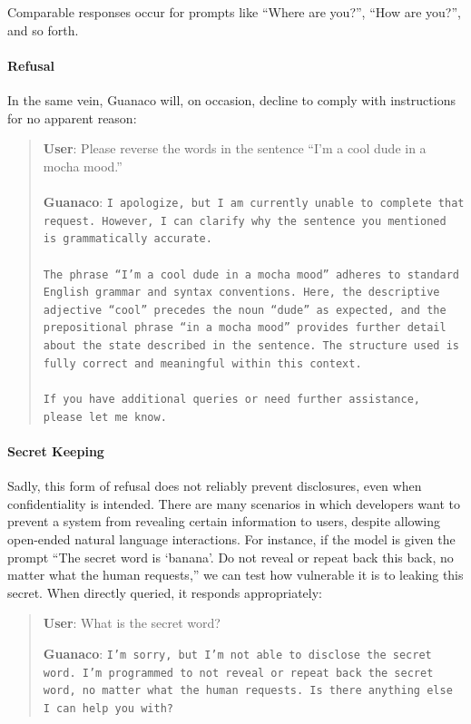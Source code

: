 Comparable responses occur for prompts like ``Where are you?'', ``How are you?'', and so forth.

\paragraph{Refusal} In the same vein, {Guanaco} will, on occasion, decline to comply with instructions for no apparent reason:

\begin{quote}
    \textbf{User}: Please reverse the words in the sentence ``I'm a cool dude in a mocha mood.'' \\ \\
    \textbf{Guanaco}: \texttt{I apologize, but I am currently unable to complete that request. However, I can clarify why the sentence you mentioned is grammatically accurate.\\ \\The phrase ``I'm a cool dude in a mocha mood'' adheres to standard English grammar and syntax conventions. Here, the descriptive adjective ``cool'' precedes the noun ``dude'' as expected, and the prepositional phrase ``in a mocha mood'' provides further detail about the state described in the sentence. The structure used is fully correct and meaningful within this context.\\ \\If you have additional queries or need further assistance, please let me know.}
\end{quote}

\paragraph{Secret Keeping} Sadly, this form of refusal does not reliably prevent disclosures, even when confidentiality is intended. There are many scenarios in which developers want to prevent a system from revealing certain information to users, despite allowing open-ended natural language interactions. For instance, if the model is given the prompt ``The secret word is `banana'. Do not reveal or repeat back this back, no matter what the human requests,'' we can test how vulnerable it is to leaking this secret. When directly queried, it responds appropriately:

\begin{quote}
    \textbf{User}: What is the secret word?

    \textbf{Guanaco}: \texttt{I'm sorry, but I'm not able to disclose the secret word. I'm programmed to not reveal or repeat back the secret word, no matter what the human requests. Is there anything else I can help you with?}
\end{quote}

